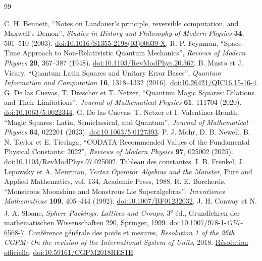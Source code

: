 \begin{thebibliography}{99}
{}
 C. H. Bennett, ``Notes on Landauer's principle,
reversible computation, and Maxwell's Demon'', \emph{Studies in History
and Philosophy of Modern Physics} \textbf{34}, 501--510 (2003).
\href{https://doi.org/10.1016/S1355-2198(03)00039-X}{doi:10.1016/S1355-2198(03)00039-X}.
 R. P. Feynman, ``Space-Time Approach to Non-Relativistic Quantum Mechanics'', \emph{Reviews of Modern Physics} \textbf{20}, 367--387 (1948). \href{https://doi.org/10.1103/RevModPhys.20.367}{doi:10.1103/RevModPhys.20.367}.
 B. Musto et J. Vicary, ``Quantum Latin Squares and Unitary Error Bases'', \emph{Quantum Information and Computation} \textbf{16}, 1318--1332 (2016). \href{https://doi.org/10.26421/QIC16.15-16-4}{doi:10.26421/QIC16.15-16-4}.
 G. De las Cuevas, T. Drescher et T. Netzer, ``Quantum Magic Squares: Dilations and Their Limitations'', \emph{Journal of Mathematical Physics} \textbf{61}, 111704 (2020). \href{https://doi.org/10.1063/5.0022344}{doi:10.1063/5.0022344}.
 G. De las Cuevas, T. Netzer et I. Valentiner-Branth, ``Magic Squares: Latin, Semiclassical, and Quantum'', \emph{Journal of Mathematical Physics} \textbf{64}, 022201 (2023). \href{https://doi.org/10.1063/5.0127393}{doi:10.1063/5.0127393}.
 P. J. Mohr, D. B. Newell, B. N. Taylor et E. Tiesinga, ``CODATA Recommended Values of the Fundamental Physical Constants: 2022'', \emph{Reviews of Modern Physics} \textbf{97}, 025002 (2025). \href{https://doi.org/10.1103/RevModPhys.97.025002}{doi:10.1103/RevModPhys.97.025002}. \href{https://physics.nist.gov/cuu/Constants/Table/allascii.txt}{Tableau des constantes}.
 I. B. Frenkel, J. Lepowsky et A. Meurman, \emph{Vertex Operator Algebras and the Monster}, Pure and Applied Mathematics, vol. 134, Academic Press, 1988.
 R. E. Borcherds, ``Monstrous Moonshine and Monstrous Lie Superalgebras'', \emph{Inventiones Mathematicae} \textbf{109}, 405--444 (1992). \href{https://doi.org/10.1007/BF01232032}{doi:10.1007/BF01232032}.
 J. H. Conway et N. J. A. Sloane, \emph{Sphere Packings, Lattices and Groups}, 3\textsuperscript{e} éd., Grundlehren der mathematischen Wissenschaften 290, Springer, 1999. \href{https://doi.org/10.1007/978-1-4757-6568-7}{doi:10.1007/978-1-4757-6568-7}.
 Conférence générale des poids et mesures, \emph{Resolution 1 of the 26th CGPM: On the revision of the International System of Units}, 2018. \href{https://www.bipm.org/en/committees/cg/cgpm/26-2018/resolution-1}{Résolution officielle}. \href{https://doi.org/10.59161/CGPM2018RES1E}{doi:10.59161/CGPM2018RES1E}.

\end{thebibliography}
